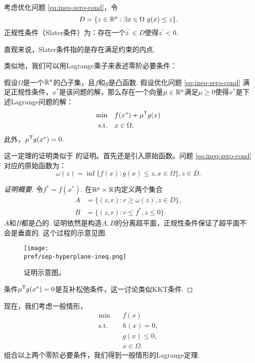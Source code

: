 \begin{definition}[Slater条件]
考虑优化问题 \eqref{eq:ineq-zero-cond}，令
\[D=\{z\in \mathbb{R}^p:\exists x\in\Omega\ {g(x)\le z}\}.\]
正规性条件（Slater条件）为：存在一个$z^\prime\in D$使得$z^\prime<0$. 
\end{definition}
直观来说，Slater条件指的是存在满足约束的内点.

类似地，我们可以用Lagrange乘子来表述零阶必要条件：
\begin{theorem}\label{thm:ineq-zero-cond}
假设$\Omega$是一个$\mathbb{R}^n$的凸子集，且$f$和${g}$是凸函数. 假设优化问题 \eqref{eq:ineq-zero-cond} 满足正规性条件，${x^\ast}$是该问题的解，那么存在一个向量${\mu}\in \mathbb{R}^p$满足$\mu\ge 0$使得${x^\ast}$是下述Lagrange问题的解：
\begin{align*}
\min\quad &f({x^\ast})+\mu^{\mathsf{T}} g(x)\\
\text{s.t.}\quad& x\in\Omega.
\end{align*}
此外，${\mu^{\mathsf{T}} g(x^\ast)}=0.$
\end{theorem}

这一定理的证明类似于 的证明。首先还是引入原始函数。问题 \eqref{eq:ineq-zero-cond} 对应的原始函数为：
    $$\omega({z})=\inf\{f({x}):g(x)\le{z},x\in\Omega\},z\in D.$$


\begin{proof}[证明概要]
令$f^\ast=f({x^\ast})$. 在$\mathbb{R}^{p}\times\mathbb{R}$内定义两个集合
\begin{align*}
    A&=\{(z,r):r\ge \omega(z), z\in D\},\\
    B&=\{(z,r):r\le f^\ast, z\leq 0\}.
\end{align*}
$A$和$B$都是凸的. 证明依然是构造$A,B$的分离超平面，正规性条件保证了超平面不会是垂直的. 这个过程的示意见图.
\begin{figure}
    \centering
    \texttt{[image: \\pref/sep-hyperplane-ineq.png]}
    \caption{证明示意图。}
    \label{fig:sep-hyperplane-ineq}
\end{figure}

条件$\mu^{\mathsf{T}} g(x^\ast)=0$是互补松弛条件，这一讨论类似KKT条件. 
\end{proof}

现在，我们考虑一般情形，
    \begin{equation}
          \begin{aligned}
        \min\quad & f({x}) \\
        \text{s.t.}\quad& {h(x)=0}, \\
        &g(x)\leq 0, \\
        &{x}\in\Omega.
        \end{aligned}\label{eq:mix-zero-cond}
    \end{equation}
组合以上两个零阶必要条件，我们得到一般情形的Lagrange定理.

